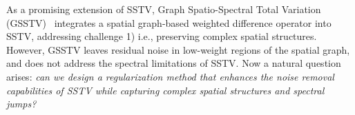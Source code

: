 
As a promising extension of SSTV, Graph Spatio-Spectral Total Variation (GSSTV)~\cite{Takemoto2022GSSTV} integrates a spatial graph-based weighted difference operator into SSTV, addressing challenge 1) i.e., preserving complex spatial structures.
However, GSSTV leaves residual noise in low-weight regions of the spatial graph, and does not address the spectral limitations of SSTV. Now a natural question arises: \textit{can we design a regularization method that enhances the noise removal capabilities of SSTV while capturing complex spatial structures and spectral jumps?}

